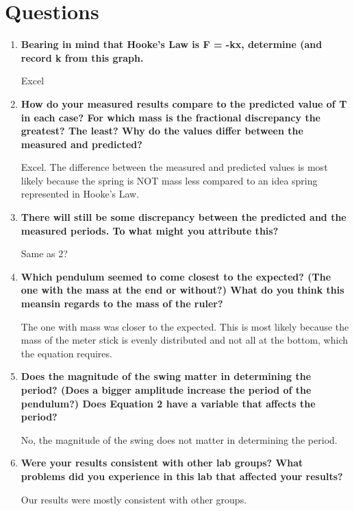 
 \section{Questions}

\vspace{-0.5cm}
\singlespacing

\begin{enumerate}
	\item \textbf{Bearing in mind that Hooke's Law is F = -kx, determine (and record k from this graph.}

	Excel

	\item \textbf{How do your measured results compare to the predicted value of T in each case? For which mass is the fractional discrepancy the greatest? The least? Why do the values differ between the measured and predicted?}
 
	Excel. The difference between the measured and predicted values is most likely because the spring is NOT mass less compared to an idea spring represented in Hooke's Law.  

\item \textbf{There will still be some discrepancy between the predicted and the measured periods. To what might you attribute this?}

Same as 2?

\item \textbf{Which pendulum seemed to come closest to the expected? (The one with the mass at the end or without?) What do you think this meansin regards to the mass of the ruler?}

The one with mass was closer to the expected. This is most likely because the mass of the meter stick is evenly distributed and not all at the bottom, which the equation requires.

\item \textbf{Does the magnitude of the swing matter in determining the period? (Does a bigger amplitude increase the period of the pendulum?) Does Equation 2 have a variable that affects the period?}

No, the magnitude of the swing does not matter in determining the period.

\item \textbf{Were your results consistent with other lab groups? What problems did you experience in this lab that affected your results?}

	Our results were mostly consistent with other groups.

\end{enumerate}

\newpage
